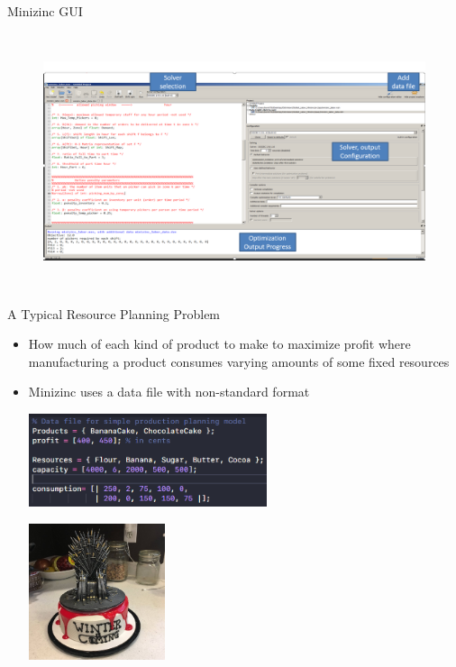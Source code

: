 \documentclass[xcolor=dvipsnames,aspectratio=169]{beamer}
\begin{document}
\begin{frame}{Minizinc GUI}
\begin{figure}
    \centering
    \includegraphics[scale=0.8, width=15cm, height= 7.5cm]{minizinc_gui.PNG}
    \end{figure}
\end{frame}

\begin{frame}{A Typical Resource Planning Problem}
        \begin{itemize}
            \item  How much of each kind of product to make to maximize profit where manufacturing a product consumes varying amounts of some fixed resources
            \item Minizinc uses a data file with non-standard format
            \begin{multicols}{2}
            \includegraphics[width = 70mm ]{mz_production_data.png}
            \columnbreak
            
            \includegraphics[width = 40mm]{cake.jpg}
            \end{multicols}
        \end{itemize}

\end{frame}
\end{document}
